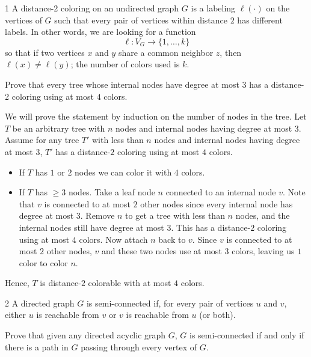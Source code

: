 \documentclass[12pt]{article}
\begin{document}



\begin{problem}{1}
    A distance-2 coloring on an undirected graph $G$ is a labeling $\ell(\cdot)$ on the vertices of $G$ such that every pair of vertices within distance $2$ has different labels. In other words, we are looking for a function 
    \[
    \ell : V_G \to \{1, \dots, k\}
    \]
    so that if two vertices $x$ and $y$ share a common neighbor $z$, then $\ell(x) \ne \ell(y)$; the number of colors used is $k$.

    Prove that every tree whose internal nodes have degree at most $3$ has a distance-2 coloring using at most $4$ colors.
\end{problem}

\begin{solution}
    \bbni

    We will prove the statement by induction on the number of nodes in the tree. Let $T$ be an arbitrary tree with $n$ nodes and internal nodes having degree at most $3$. Assume for any tree $T'$ with less than $n$ nodes and internal nodes having degree at most $3$, $T'$ has a distance-$2$ coloring using at most $4$ colors. 
    \begin{itemize}
        \item If $T$ has $1$ or $2$ nodes we can color it with $4$ colors. 
        \item If $T$ has $\geq 3$ nodes. Take a leaf node $n$ connected to an internal node $v$. Note that $v$ is connected to at most $2$ other nodes since every internal node has degree at most $3$. Remove $n$ to get a tree with less than $n$ nodes, and the internal nodes still have degree at most $3$. This has a distance-$2$ coloring using at most $4$ colors. Now attach $n$ back to $v$. Since $v$ is connected to at most $2$ other nodes, $v$ and these two nodes use at most $3$ colors, leaving us $1$ color to color $n$.
    \end{itemize}
        Hence, $T$ is distance-$2$ colorable with at most $4$ colors. 
\end{solution}

\newpage

\begin{problem}{2}
    A directed graph $G$ is semi-connected if, for every pair of vertices $u$ and $v$, either $u$ is reachable from $v$ or $v$ is reachable from $u$ (or both).

    Prove that given any directed acyclic graph $G$, $G$ is semi-connected if and only if there is a path in $G$ passing through every vertex of $G$. 
\end{problem}
\end{document}
